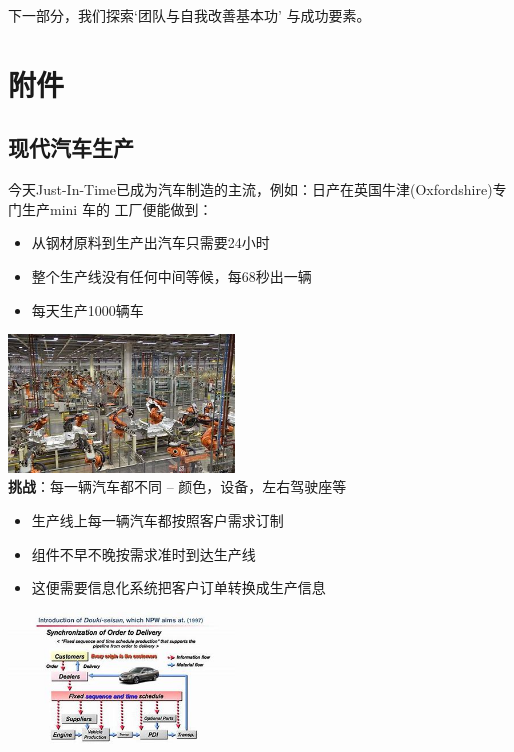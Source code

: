 下一部分，我们探索`团队与自我改善基本功' 与成功要素。

\hypertarget{ux9644ux4ef6}{%
\section{附件}\label{ux9644ux4ef6}}

\hypertarget{ux73b0ux4ee3ux6c7dux8f66ux751fux4ea7}{%
\subsection{现代汽车生产}\label{ux73b0ux4ee3ux6c7dux8f66ux751fux4ea7}}

今天Just-In-Time已成为汽车制造的主流，例如：日产在英国牛津(Oxfordshire)专门生产mini
车的 工厂便能做到：

\begin{itemize}
\tightlist
\item
  从钢材原料到生产出汽车只需要24小时
\item
  整个生产线没有任何中间等候，每68秒出一辆
\item
  每天生产1000辆车
\end{itemize}

\includegraphics[width=6cm]{NissanRobots-OIPh8UAC7FBjlaCmA_mBepJjQHaEi.jpg}\\
\textbf{挑战}：每一辆汽车都不同 -- 颜色，设备，左右驾驶座等

\begin{itemize}
\tightlist
\item
  生产线上每一辆汽车都按照客户需求订制
\item
  组件不早不晚按需求准时到达生产线
\item
  这便需要信息化系统把客户订单转换成生产信息
\end{itemize}

\includegraphics[width=6cm]{NissanJIT_OIPRQGKy67DWGTu-DQiOCqW2gHaEK.jpg}\\

